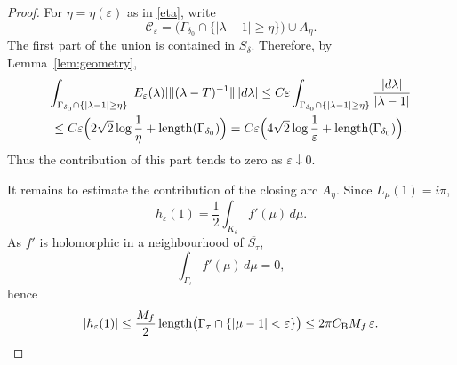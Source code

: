 \documentclass[11pt]{amsart}
\numberwithin{equation}{section}
\theoremstyle{definition}
\theoremstyle{plain}
\begin{document}
\begin{proof}
For \(\eta=\eta(\varepsilon)\) as in \eqref{eta}, write
\[
   \mathcal C_\varepsilon
   =
   \bigl(\Gamma_{\delta_0}\cap\{|\lambda-1|\ge\eta\}\bigr)
   \cup A_\eta .
\]
The first part of the union is contained in \(S_\delta\).  Therefore, by Lemma~\ref{lem:geometry}, 
\begin{gather}\label{delta0}
   \int_{\Gamma_{\delta_0}\cap\{|\lambda-1|\ge\eta\}}
   |E_\varepsilon(\lambda)|
   \|(\lambda-T)^{-1}\|\,|d\lambda| 
    \le
   C\varepsilon
   \int_{\Gamma_{\delta_0}\cap\{|\lambda-1|\ge\eta\}}
   \frac{|d\lambda|}{|\lambda-1|} \\
   \le
   C\varepsilon
   \Bigl(
      2\sqrt2\log\frac1\eta
      +
      \operatorname{length}(\Gamma_{\delta_0})
   \Bigr) 
   =
   C\varepsilon
   \Bigl(
      4\sqrt2\log\frac1\varepsilon
      +
      \operatorname{length}(\Gamma_{\delta_0})
   \Bigr).\notag
\end{gather}
Thus the contribution of this part tends to zero as $\varepsilon \downarrow 0.$



It remains to estimate the contribution of the closing arc \(A_\eta\).  Since \(L_\mu(1)=i\pi\),
\[
        h_\varepsilon(1)
        =
        \frac12 
        \int_{K_\varepsilon}f'(\mu)\,d\mu .
\]
As \(f'\) is holomorphic in a neighbourhood of \(\overline{S_\tau}\),
\[
        \int_{\Gamma_\tau}f'(\mu)\,d\mu=0,
\]
hence
\[
\begin{aligned}
        |h_\varepsilon(1)|
        \le
        \frac{M_f}{2}
        \operatorname{length}
        \bigl(\Gamma_\tau\cap\{|\mu-1|<\varepsilon\}\bigr) 
        \le
        2\pi C_{\rm B}M_f\,\varepsilon.
\end{aligned}
\]



\end{proof}
\end{document}
